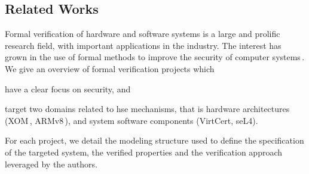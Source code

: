 %


\subsection{Related Works}
\label{subsec:sota:ltsrelated}

Formal verification of hardware and software systems is a large and prolific
research field, with important applications in the industry.
%
The interest has grown in the use of formal methods to improve the security of
computer systems\,\cite{chong2016report}.
%
We give an overview of formal verification projects which
%
\begin{inparaenum}[(1)]
\item have a clear focus on security, and
\item target two domains related to \ac{hse} mechanisms, that is hardware
  architectures (XOM\,\cite{lie2003xom}, ARMv8\,\cite{reid2016armv8}), and
  system software components (VirtCert, seL4).
\end{inparaenum}
%
For each project, we detail the modeling structure used to define the
specification of the targeted system, the verified properties and the
verification approach leveraged by the authors.

